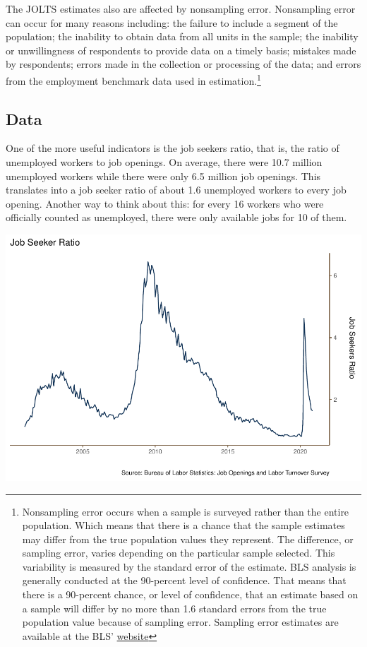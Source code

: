 \documentclass[
  11pt,
]{article}
\begin{document}
The JOLTS estimates also are affected by nonsampling error. Nonsampling
error can occur for many reasons including: the failure to include a
segment of the population; the inability to obtain data from all units
in the sample; the inability or unwillingness of respondents to provide
data on a timely basis; mistakes made by respondents; errors made in the
collection or processing of the data; and errors from the employment
benchmark data used in estimation.\footnote{Nonsampling error occurs
  when a sample is surveyed rather than the entire population. Which
  means that there is a chance that the sample estimates may differ from
  the true population values they represent. The difference, or sampling
  error, varies depending on the particular sample selected. This
  variability is measured by the standard error of the estimate. BLS
  analysis is generally conducted at the 90-percent level of confidence.
  That means that there is a 90-percent chance, or level of confidence,
  that an estimate based on a sample will differ by no more than 1.6
  standard errors from the true population value because of sampling
  error. Sampling error estimates are available at the BLS'
  \href{https://www.bls.gov/jlt/jolts_median_standard_errors.htm}{website}}

\hypertarget{data}{%
\subsection{Data}\label{data}}

One of the more useful indicators is the job seekers ratio, that is, the
ratio of unemployed workers to job openings. On average, there were 10.7
million unemployed workers while there were only 6.5 million job
openings. This translates into a job seeker ratio of about 1.6
unemployed workers to every job opening. Another way to think about
this: for every 16 workers who were officially counted as unemployed,
there were only available jobs for 10 of them.

\begin{center}\includegraphics{JOLTS_files/figure-latex/unnamed-chunk-4-1} \end{center}
\end{document}
